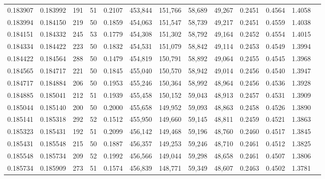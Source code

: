 \begin{tabular}{rrrrrrrrrrrrr}
0.183907 & 0.183992 &   191 &  51 &                                     0.2107 & 453,844 & 151,766 &  58,689 &  49,267 & 0.2451 & 0.4564 & 1.4058 \\
0.183994 & 0.184150 &   219 &  50 &                                     0.1859 & 454,063 & 151,547 &  58,739 &  49,217 & 0.2451 & 0.4559 & 1.4038 \\
0.184151 & 0.184332 &   245 &  53 &                                     0.1779 & 454,308 & 151,302 &  58,792 &  49,164 & 0.2452 & 0.4554 & 1.4015 \\
0.184334 & 0.184422 &   223 &  50 &                                     0.1832 & 454,531 & 151,079 &  58,842 &  49,114 & 0.2453 & 0.4549 & 1.3994 \\
0.184422 & 0.184564 &   288 &  50 &                                     0.1479 & 454,819 & 150,791 &  58,892 &  49,064 & 0.2455 & 0.4545 & 1.3968 \\
0.184565 & 0.184717 &   221 &  50 &                                     0.1845 & 455,040 & 150,570 &  58,942 &  49,014 & 0.2456 & 0.4540 & 1.3947 \\
0.184717 & 0.184884 &   206 &  50 &                                     0.1953 & 455,246 & 150,364 &  58,992 &  48,964 & 0.2456 & 0.4536 & 1.3928 \\
0.184885 & 0.185041 &   212 &  51 &                                     0.1939 & 455,458 & 150,152 &  59,043 &  48,913 & 0.2457 & 0.4531 & 1.3909 \\
0.185044 & 0.185140 &   200 &  50 &                                     0.2000 & 455,658 & 149,952 &  59,093 &  48,863 & 0.2458 & 0.4526 & 1.3890 \\
0.185141 & 0.185318 &   292 &  52 &                                     0.1512 & 455,950 & 149,660 &  59,145 &  48,811 & 0.2459 & 0.4521 & 1.3863 \\
0.185323 & 0.185431 &   192 &  51 &                                     0.2099 & 456,142 & 149,468 &  59,196 &  48,760 & 0.2460 & 0.4517 & 1.3845 \\
0.185431 & 0.185548 &   215 &  50 &                                     0.1887 & 456,357 & 149,253 &  59,246 &  48,710 & 0.2461 & 0.4512 & 1.3825 \\
0.185548 & 0.185734 &   209 &  52 &                                     0.1992 & 456,566 & 149,044 &  59,298 &  48,658 & 0.2461 & 0.4507 & 1.3806 \\
0.185734 & 0.185909 &   273 &  51 &                                     0.1574 & 456,839 & 148,771 &  59,349 &  48,607 & 0.2463 & 0.4502 & 1.3781 \\

\end{tabular}

